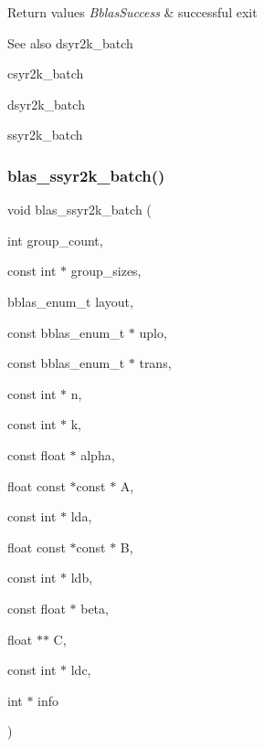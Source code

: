 \begin{DoxyRetVals}{Return values}
{\em Bblas\+Success} & successful exit\\
\hline
\end{DoxyRetVals}
\begin{DoxySeeAlso}{See also}
dsyr2k\+\_\+batch 

csyr2k\+\_\+batch 

dsyr2k\+\_\+batch 

ssyr2k\+\_\+batch 
\end{DoxySeeAlso}
\mbox{\label{group__syr2k__batch_ga644c1621654e2a6df012fc6d50cdcac7}} 
\subsubsection{\texorpdfstring{blas\+\_\+ssyr2k\+\_\+batch()}{blas\_ssyr2k\_batch()}}
{\footnotesize\ttfamily void blas\+\_\+ssyr2k\+\_\+batch (\begin{DoxyParamCaption}\item[{int}]{group\+\_\+count,  }\item[{const int $\ast$}]{group\+\_\+sizes,  }\item[{bblas\+\_\+enum\+\_\+t}]{layout,  }\item[{const bblas\+\_\+enum\+\_\+t $\ast$}]{uplo,  }\item[{const bblas\+\_\+enum\+\_\+t $\ast$}]{trans,  }\item[{const int $\ast$}]{n,  }\item[{const int $\ast$}]{k,  }\item[{const float $\ast$}]{alpha,  }\item[{float const $\ast$const $\ast$}]{A,  }\item[{const int $\ast$}]{lda,  }\item[{float const $\ast$const $\ast$}]{B,  }\item[{const int $\ast$}]{ldb,  }\item[{const float $\ast$}]{beta,  }\item[{float $\ast$$\ast$}]{C,  }\item[{const int $\ast$}]{ldc,  }\item[{int $\ast$}]{info }\end{DoxyParamCaption})}

